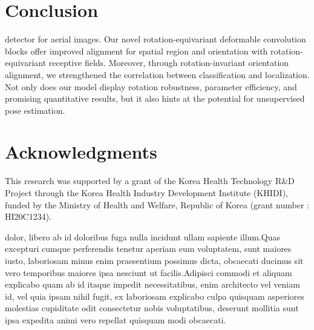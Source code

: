\documentclass[letterpaper]{article} %
\begin{document}
\section{Conclusion}
 detector for aerial images. Our novel rotation-equivariant deformable convolution blocks offer improved alignment for spatial region and orientation with rotation-equivariant receptive fields. Moreover, through rotation-invariant orientation alignment, we strengthened the correlation between classification and localization. Not only does our model display rotation robustness, parameter efficiency, and promising quantitative results, but it also hints at the potential for unsupervised pose estimation.

\section{Acknowledgments}
This research was supported by a grant of the Korea Health Technology R\&D Project through the Korea Health Industry Development Institute (KHIDI), funded by the Ministry of Health and Welfare, Republic of Korea (grant number : HI20C1234).



\appendix


 dolor, libero ab id doloribus fuga nulla incidunt ullam sapiente illum.Quas excepturi cumque perferendis tenetur aperiam eum voluptatem, sunt maiores iusto, laboriosam minus enim praesentium possimus dicta, obcaecati ducimus sit vero temporibus maiores ipsa nesciunt ut facilis.Adipisci commodi et aliquam explicabo quam ab id itaque impedit necessitatibus, enim architecto vel veniam id, vel quia ipsam nihil fugit, ex laboriosam explicabo culpa quisquam asperiores molestias cupiditate odit consectetur nobis voluptatibus, deserunt mollitia sunt ipsa expedita animi vero repellat quisquam modi obcaecati.\clearpage

\end{document}

